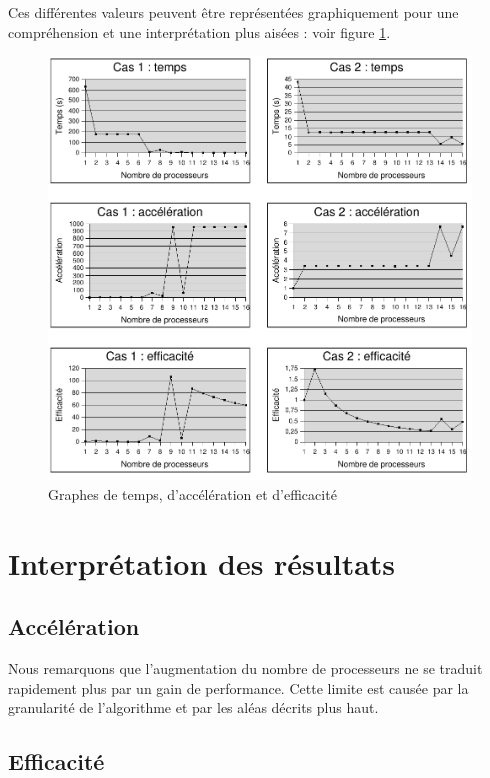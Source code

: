 \documentclass[a4paper,11pt]{report}
\begin{document}
Ces différentes valeurs peuvent être représentées graphiquement pour une
compréhension et une interprétation plus aisées : voir figure \ref{graphes}.

\begin{figure}[!htb]
  \centering\noindent
  \includegraphics[keepaspectratio,width=\textwidth]{schemas/mesures}
  \caption{Graphes de temps, d'accélération et d'efficacité}
  \label{graphes}
\end{figure}

\section{Interprétation des résultats}

\subsection{Accélération}

Nous remarquons que l'augmentation du nombre de processeurs ne se traduit
rapidement plus par un gain de performance. Cette limite est causée par la
granularité de l'algorithme et par les aléas décrits plus haut.

\subsection{Efficacité}
\end{document}
